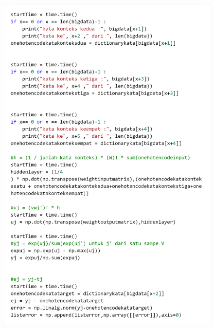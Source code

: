 \documentclass[12pt]{report}
\begin{document}
\begin{figure}[H]
\centering
\includegraphics[scale=0.3]{trainingcbow4kata3}
\end{figure}
\end{document}
